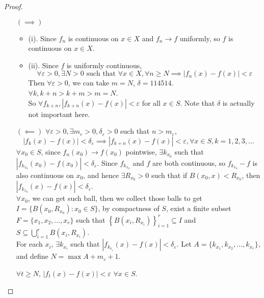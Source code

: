 \begin{proof}
    \vphantom{text}
    \begin{itemize}
        \item [\((\implies )\)]
            \begin{itemize}
                \item (i). Since $f_n$ is continuous on $x \in X$ and $f_n \to f$ uniformly, so $f$ is continuous on $x \in X$.
                \item (ii). Since $f$ is uniformly continuous,
                \[
                \forall \varepsilon > 0, \exists N > 0 \text{ such that } \forall x\in X,\forall n \geq N \implies |f_n(x) - f(x)| < \varepsilon 
                \]
                Then $\forall \varepsilon > 0$, we can take $m = N$, $\delta = 114514$. $\forall k, k+ n > k+m > m = N$. \\
                So $\forall f_{k+n}, |f_{k+n}(x) - f(x)| < \varepsilon$ for all $x \in S$. Note that $\delta$ is actually not important here.
            \end{itemize}
        \item [\((\impliedby )\)]
            $\forall \varepsilon >0, \exists m_{\varepsilon} > 0, \delta_{\varepsilon} > 0$ such that $n > m_{\varepsilon}$,
            \[
                |f_k(x)-f(x)| < \delta_{\varepsilon} \implies |f_{k+n}(x)-f(x)| < \varepsilon, \forall x \in S, k = 1,2,3,...
            \]
            $\forall x_0 \in S$, since $f_n(x_0) \to f(x_0)$ pointwise, $\exists k_{x_0}$ such that $|f_{k_{x_0}}(x_0) - f(x_0)| < \delta_{\varepsilon}$.
            Since $f_{k_{x_0}}$ and $f$ are both continuous, so $f_{k_{x_0}} - f$ is also continuous on $x_0$, and hence $\exists R_{x_0} > 0$ such that if $B(x_0, x) < R_{x_0}$, then $|f_{k_{x_0}}(x) - f(x)| < \delta_{\varepsilon}$. \\
            $\forall x_0$, we can get such ball, then we collect those balls to get $I = \{B(x_0, R_{x_0}) : x_0 \in S\}$, by compactness of $S$, exist a finite subset $F = \{x_1, x_2, ... ,x_r\}$ such that $\left\{B(x_i, R_{x_i})\right\}_{i=1}^{r} \subseteq I$ and $ S \subseteq \bigcup_{i=1}^{r} B(x_i, R_{x_i})$. \\
            For each $x_i$, $\exists k_{x_i}$ such that $|f_{k_{x_i}}(x) - f(x)| < \delta_{\varepsilon}$. Let $A = \{k_{x_1}, k_{x_2}, ..., k_{x_r}\}$, and define $N = \max{A} + m_{\varepsilon} + 1$.
            \begin{claim}
                $\forall t \geq N$, $|f_t(x)-f(x)| < \varepsilon$ $\forall x \in S$.
            \end{claim}

\end{itemize}
\end{proof}
